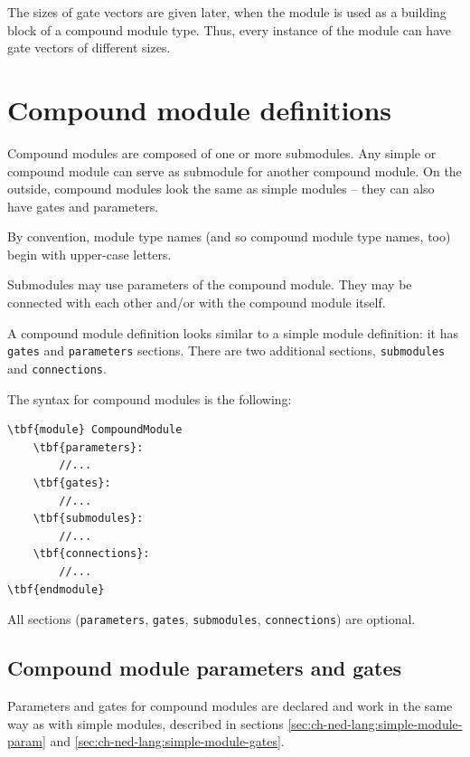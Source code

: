 The sizes of gate vectors are given later, when the module is used as
a building block of a compound module type. Thus, every instance of
the module can have gate vectors of different sizes.





\section{Compound module definitions}


Compound modules are composed of one or more submodules. Any simple or
compound module can serve as submodule for another compound module.
On the outside, compound modules look the same as simple modules --
they can also have gates and parameters.

By convention, module type names (and so compound module type names, too)
begin with upper-case letters.

Submodules may use parameters of the compound module.
They may be connected with each other and/or with
the compound module itself.

A compound module definition looks
similar to a simple module definition:
it has \texttt{gates} and \texttt{parameters} sections.
There are two additional sections, \texttt{submodules} and
\texttt{connections}.

The syntax for compound modules is the following:

\begin{Verbatim}[commandchars=\\\{\}]
\tbf{module} CompoundModule
    \tbf{parameters}:
        //...
    \tbf{gates}:
        //...
    \tbf{submodules}:
        //...
    \tbf{connections}:
        //...
\tbf{endmodule}
\end{Verbatim}

All sections (\texttt{parameters}, \texttt{gates}, \texttt{submodules},
\texttt{connections}) are optional.



\subsection{Compound module parameters and gates}

Parameters and gates 
for compound modules are declared and work in the same way
as with simple modules, described in sections
\ref{sec:ch-ned-lang:simple-module-param}
and \ref{sec:ch-ned-lang:simple-module-gates}.

